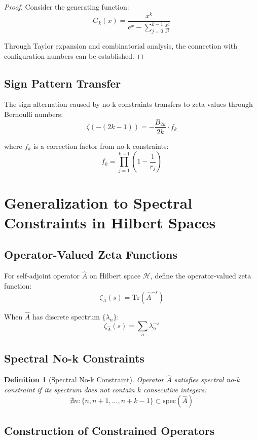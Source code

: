 \documentclass[12pt]{article}
\newtheorem{definition}[theorem]{Definition}
\begin{document}
\begin{proof}
Consider the generating function:
$$G_k(x) = \frac{x^k}{e^x - \sum_{j=0}^{k-1} \frac{x^j}{j!}}$$

Through Taylor expansion and combinatorial analysis, the connection with configuration numbers can be established.
\end{proof}

\subsection{Sign Pattern Transfer}

The sign alternation caused by no-k constraints transfers to zeta values through Bernoulli numbers:
$$\zeta(-(2k-1)) = -\frac{B_{2k}}{2k} \cdot f_k$$

where $f_k$ is a correction factor from no-k constraints:
$$f_k = \prod_{j=1}^{k-1} \left(1 - \frac{1}{r_j}\right)$$

\section{Generalization to Spectral Constraints in Hilbert Spaces}

\subsection{Operator-Valued Zeta Functions}

For self-adjoint operator $\hat{A}$ on Hilbert space $\mathcal{H}$, define the operator-valued zeta function:
$$\zeta_{\hat{A}}(s) = \text{Tr}(\hat{A}^{-s})$$

When $\hat{A}$ has discrete spectrum $\{\lambda_n\}$:
$$\zeta_{\hat{A}}(s) = \sum_{n} \lambda_n^{-s}$$

\subsection{Spectral No-k Constraints}

\begin{definition}[Spectral No-k Constraint]
Operator $\hat{A}$ satisfies spectral no-k constraint if its spectrum does not contain $k$ consecutive integers:
$$\nexists n : \{n, n+1, \ldots, n+k-1\} \subset \text{spec}(\hat{A})$$
\end{definition}

\subsection{Construction of Constrained Operators}
\end{document}
